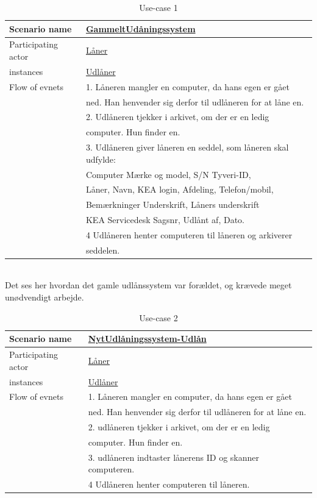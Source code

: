 \documentclass[a4paper]{article}
\begin{document}
\begin{table}[h]
\caption{Use-case 1}
\begin{tabular}{ll}
Scenario name                 & \underline{GammeltUdåningssystem} \\ \hline
Participating actor           & \underline{Låner} \\
instances                     & \underline{Udlåner} \\ \hline
Flow of evnets                & 1. Låneren mangler en computer, da hans egen er gået \\& ned. Han henvender sig derfor til udlåneren for at låne en.
\\& 2. Udlåneren tjekker i arkivet, om der er en ledig \\& computer. Hun finder en.
\\& 3. Udlåneren giver låneren en seddel, som låneren skal udfylde: \\& Computer Mærke og model, S/N Tyveri-ID, \\& Låner, Navn, KEA login, Afdeling, Telefon/mobil, \\& Bemærkninger Underskrift, Låners underskrift \\& KEA Servicedesk Sagsnr, Udlånt af, Dato.
\\& 4 Udlåneren henter computeren til låneren og arkiverer
\\& seddelen.
\end{tabular}
\end{table} \\
Det ses her hvordan det gamle udlånssystem var forældet, og krævede meget unødvendigt arbejde. \\
\begin{table}[h]
\caption{Use-case 2}
\begin{tabular}{ll}
Scenario name                 & \underline{NytUdlåningssystem-Udlån} \\ \hline
Participating actor           & \underline{Låner} \\
instances                     & \underline{Udlåner}\\ \hline
Flow of evnets                & 1. Låneren mangler en computer, da hans egen er gået              	\\& ned. Han henvender sig derfor til udlåneren for at låne en.
\\& 2. udlåneren tjekker i arkivet, om der er en ledig \\& computer. Hun finder en.
\\& 3. udlåneren indtaster lånerens ID og skanner computeren.
\\& 4 Udlåneren henter computeren til låneren.
\end{tabular}
\end{table}\\
\end{document}
